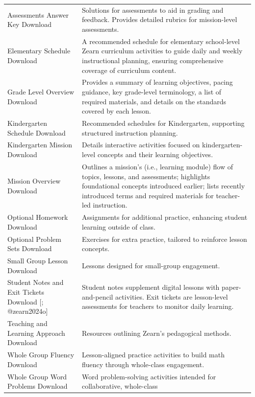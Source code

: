 \documentclass[
  number,
  preprint,
  3p,
  onecolumn]{elsarticle}
\begin{document}
\begin{longtable}[]{@{}
  >{\raggedright\arraybackslash}p{}
  >{\raggedright\arraybackslash}p{}@{}}
Assessments Answer Key Download \citep{zearn2024f} & Solutions for
assessments to aid in grading and feedback. Provides detailed rubrics
for mission-level assessments. \\
Elementary Schedule Download \citep{zearn2024g} & A recommended schedule
for elementary school-level Zearn curriculum activities to guide daily
and weekly instructional planning, ensuring comprehensive coverage of
curriculum content. \\
Grade Level Overview Download \citep{zearn2024h} & Provides a summary of
learning objectives, pacing guidance, key grade-level terminology, a
list of required materials, and details on the standards covered by each
lesson. \\
Kindergarten Schedule Download \citep{zearn2024i} & Recommended
schedules for Kindergarten, supporting structured instruction
planning. \\
Kindergarten Mission Download \citep{zearn2024j} & Details interactive
activities focused on kindergarten-level concepts and their learning
objectives. \\
Mission Overview Download \citep{zearn2024h} & Outlines a mission's
(i.e., learning module) flow of topics, lessons, and assessments;
highlights foundational concepts introduced earlier; lists recently
introduced terms and required materials for teacher-led instruction. \\
Optional Homework Download \citep{zearn2024k} & Assignments for
additional practice, enhancing student learning outside of class. \\
Optional Problem Sets Download \citep{zearn2024l} & Exercises for extra
practice, tailored to reinforce lesson concepts. \\
Small Group Lesson Download \citep{zearn2024m} & Lessons designed for
small-group engagement. \\
Student Notes and Exit Tickets Download {[}\citep{zearn2024n};
@zearn2024o{]} & Student notes supplement digital lessons with
paper-and-pencil activities. Exit tickets are lesson-level assessments
for teachers to monitor daily learning. \\
Teaching and Learning Approach Download \citep{zearn2024p} & Resources
outlining Zearn's pedagogical methods. \\
Whole Group Fluency Download \citep{zearn2024q} & Lesson-aligned
practice activities to build math fluency through whole-class
engagement. \\
Whole Group Word Problems Download \citep{zearn2024m} & Word
problem-solving activities intended for collaborative, whole-class

\end{longtable}
\end{document}
